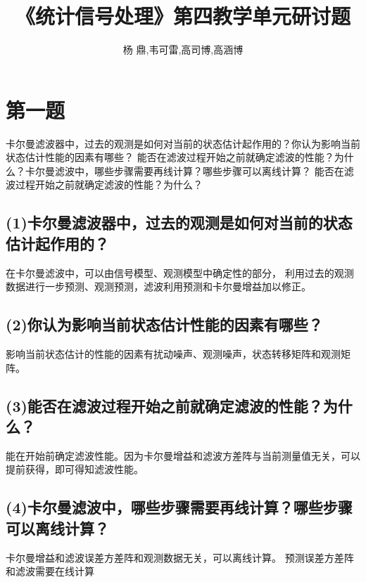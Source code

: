 \documentclass[fontset=windows]{article}
\title{\heiti\zihao{2} 《统计信号处理》第四教学单元研讨题}
\author{杨 鼎,韦可雷,高司博,高涵博}
\date{}
\numberwithin{figure}{section}
\begin{document}
\maketitle
\thispagestyle{empty}



\section{第一题}
卡尔曼滤波器中，过去的观测是如何对当前的状态估计起作用的？你认为影响当前状态估计性能的因素有哪些？
能否在滤波过程开始之前就确定滤波的性能？为什么？卡尔曼滤波中，哪些步骤需要再线计算？哪些步骤可以离线计算？
能否在滤波过程开始之前就确定滤波的性能？为什么？


\subsection*{(1)卡尔曼滤波器中，过去的观测是如何对当前的状态估计起作用的？}

在卡尔曼滤波中，可以由信号模型、观测模型中确定性的部分，
利用过去的观测数据进行一步预测、观测预测，滤波利用预测和卡尔曼增益加以修正。

\subsection*{(2)你认为影响当前状态估计性能的因素有哪些？}

影响当前状态估计的性能的因素有扰动噪声、观测噪声，状态转移矩阵和观测矩阵。

\subsection*{(3)能否在滤波过程开始之前就确定滤波的性能？为什么？}

能在开始前确定滤波性能。因为卡尔曼增益和滤波方差阵与当前测量值无关，可以提前获得，即可得知滤波性能。

\subsection*{(4)卡尔曼滤波中，哪些步骤需要再线计算？哪些步骤可以离线计算？}

卡尔曼增益和滤波误差方差阵和观测数据无关，可以离线计算。
预测误差方差阵和滤波需要在线计算
\end{document}
